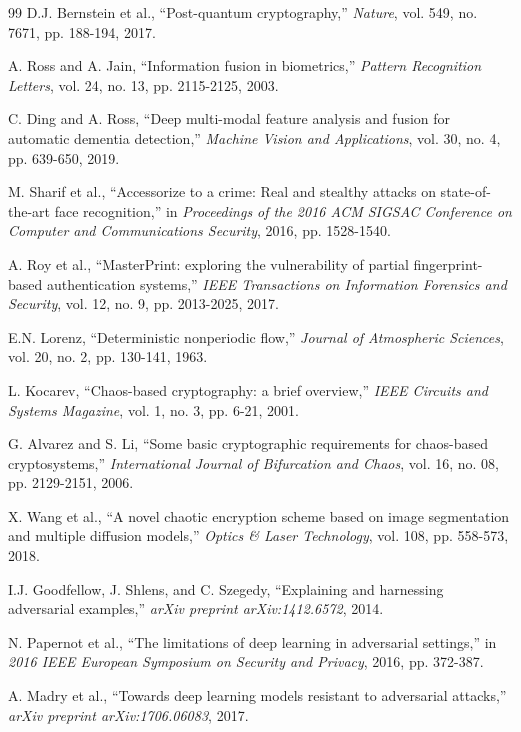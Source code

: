 \documentclass[12pt,a4paper]{article}
\begin{document}
\begin{thebibliography}{99}
D.J. Bernstein et al., ``Post-quantum cryptography,'' \emph{Nature}, vol. 549, no. 7671, pp. 188-194, 2017.

A. Ross and A. Jain, ``Information fusion in biometrics,'' \emph{Pattern Recognition Letters}, vol. 24, no. 13, pp. 2115-2125, 2003.

C. Ding and A. Ross, ``Deep multi-modal feature analysis and fusion for automatic dementia detection,'' \emph{Machine Vision and Applications}, vol. 30, no. 4, pp. 639-650, 2019.

M. Sharif et al., ``Accessorize to a crime: Real and stealthy attacks on state-of-the-art face recognition,'' in \emph{Proceedings of the 2016 ACM SIGSAC Conference on Computer and Communications Security}, 2016, pp. 1528-1540.

A. Roy et al., ``MasterPrint: exploring the vulnerability of partial fingerprint-based authentication systems,'' \emph{IEEE Transactions on Information Forensics and Security}, vol. 12, no. 9, pp. 2013-2025, 2017.

E.N. Lorenz, ``Deterministic nonperiodic flow,'' \emph{Journal of Atmospheric Sciences}, vol. 20, no. 2, pp. 130-141, 1963.

L. Kocarev, ``Chaos-based cryptography: a brief overview,'' \emph{IEEE Circuits and Systems Magazine}, vol. 1, no. 3, pp. 6-21, 2001.

G. Alvarez and S. Li, ``Some basic cryptographic requirements for chaos-based cryptosystems,'' \emph{International Journal of Bifurcation and Chaos}, vol. 16, no. 08, pp. 2129-2151, 2006.

X. Wang et al., ``A novel chaotic encryption scheme based on image segmentation and multiple diffusion models,'' \emph{Optics \& Laser Technology}, vol. 108, pp. 558-573, 2018.

I.J. Goodfellow, J. Shlens, and C. Szegedy, ``Explaining and harnessing adversarial examples,'' \emph{arXiv preprint arXiv:1412.6572}, 2014.

N. Papernot et al., ``The limitations of deep learning in adversarial settings,'' in \emph{2016 IEEE European Symposium on Security and Privacy}, 2016, pp. 372-387.

A. Madry et al., ``Towards deep learning models resistant to adversarial attacks,'' \emph{arXiv preprint arXiv:1706.06083}, 2017.


\end{thebibliography}
\end{document}
